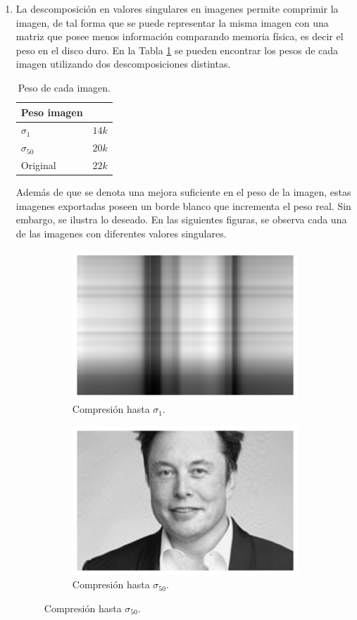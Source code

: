 \documentclass[fleqn]{article}
\begin{document}
\begin{enumerate}
  \item La descomposición en valores singulares en imagenes permite comprimir la
    imagen, de tal forma que se puede representar la misma imagen con una matriz
    que posee menos información comparando memoria física, es decir el peso en
    el disco duro. En la Tabla \ref{tab:pesos} se pueden encontrar los pesos de
    cada imagen utilizando dos descomposiciones distintas.
    \begin{table}[H]
      \centering
      \begin{tabular}{ll}
        \hline
        \textbf{Peso imagen} \\ \hline
        $\sigma_{1}$   & $14k$   \\
        $\sigma_{50}$   & $20k$    \\
        Original & $22k$ \\ \hline
      \end{tabular}
      \caption{Peso de cada imagen.}
      \label{tab:pesos}
    \end{table}
    Además de que se denota una mejora suficiente en el peso de la imagen, estas
    imagenes exportadas poseen un borde blanco que incrementa el peso real. Sin
    embargo, se ilustra lo deseado. En las siguientes figuras, se observa cada
    una de las imagenes con diferentes valores singulares.
    \begin{figure}[H]
      \centering
      \begin{subfigure}[b]{0.45\textwidth}
        \centering \includegraphics[scale=.6]{figs/exercise-2-svd-1}
        \caption{Compresión hasta $\sigma_{1}$.}
      \end{subfigure}
      \begin{subfigure}[b]{0.45\textwidth}
        \centering \includegraphics[scale=0.6]{figs/exercise-2-svd-50}
        \caption{Compresión hasta $\sigma_{50}$.}
      \end{subfigure}
    \end{figure}


\end{enumerate}
\end{document}
